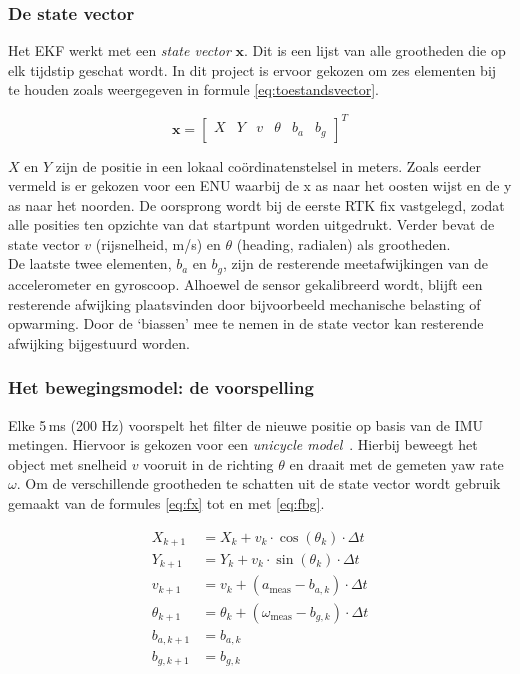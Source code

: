 \subsubsection{De state vector}

Het EKF werkt met een \textit{state vector} $\mathbf{x}$. Dit is een lijst van alle grootheden die op elk tijdstip geschat wordt. In dit project is ervoor gekozen om zes elementen bij te houden zoals weergegeven in formule \ref{eq:toestandsvector}.

\begin{equation}
    \mathbf{x} = \begin{bmatrix} X & Y & v & \theta & b_a & b_g \end{bmatrix}^T
    \label{eq:toestandsvector}
\end{equation}

$X$ en $Y$ zijn de positie in een lokaal coördinatenstelsel in meters. Zoals eerder vermeld is er gekozen voor een ENU waarbij de x as naar het oosten wijst en de y as naar het noorden. De oorsprong wordt bij de eerste RTK fix vastgelegd, zodat alle posities ten opzichte van dat startpunt worden uitgedrukt. Verder bevat de state vector $v$ (rijsnelheid, m/s) en $\theta$ (heading, radialen) als grootheden. \\

De laatste twee elementen, $b_a$ en $b_g$, zijn de resterende meetafwijkingen
van de accelerometer en gyroscoop. Alhoewel de sensor gekalibreerd wordt, blijft een resterende afwijking plaatsvinden door bijvoorbeeld mechanische belasting of opwarming. Door de `biassen' mee te nemen in de state vector kan resterende afwijking bijgestuurd worden.

\subsubsection{Het bewegingsmodel: de voorspelling}

Elke 5\,ms (200 Hz) voorspelt het filter de nieuwe positie op basis van de IMU metingen. Hiervoor is gekozen voor een \textit{unicycle model}~\cite{lavalle2006planning}. Hierbij beweegt het object met snelheid $v$ vooruit in de richting $\theta$ en draait met de gemeten yaw rate $\omega$. Om de verschillende grootheden te schatten uit de state vector wordt gebruik gemaakt van de formules \ref{eq:fx} tot en met \ref{eq:fbg}.

\begin{align}
    X_{k+1}      &= X_k + v_k \cdot \cos(\theta_k) \cdot \Delta t \label{eq:fx}\\
    Y_{k+1}      &= Y_k + v_k \cdot \sin(\theta_k) \cdot \Delta t \label{eq:fy}\\
    v_{k+1}      &= v_k + (a_{\text{meas}} - b_{a,k}) \cdot \Delta t \label{eq:fv}\\
    \theta_{k+1} &= \theta_k + (\omega_{\text{meas}} - b_{g,k}) \cdot \Delta t \label{eq:ftheta}\\
    b_{a,k+1}    &= b_{a,k} \label{eq:fba}\\
    b_{g,k+1}    &= b_{g,k} \label{eq:fbg}
\end{align}

